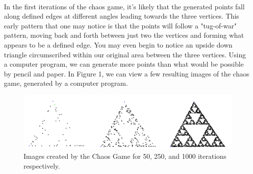 \documentclass{article}
\begin{document}
\paragraph{}
In the first iterations of the chaos game, it's likely that the generated points fall along defined edges at different angles leading towards the three vertices. This early pattern that one may notice is that the points will follow a "tug-of-war" pattern, moving back and forth between just two the vertices and forming what appears to be a defined edge. You may even begin to notice an upside down triangle circumscribed within our original area between the three vertices. Using a computer program, we can generate more points than what would be possible by pencil and paper. In Figure 1, we can view a few resulting images of the chaos game, generated by a computer program.
\begin{figure}[H]
    \includegraphics[width=\linewidth, height=.2\textheight]{combined_image}
    \caption{Images created by the Chaos Game for 50, 250, and 1000 iterations respectively.}
\end{figure}
\end{document}
